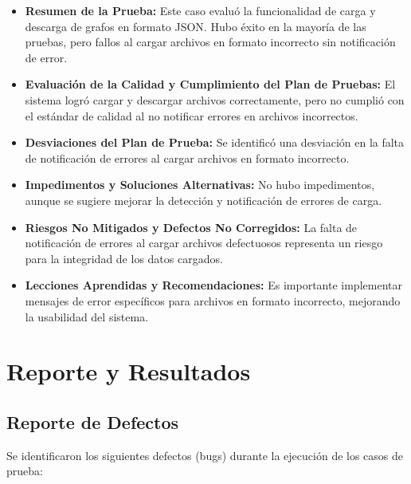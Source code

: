 \documentclass[stu, 12pt, letterpaper, donotrepeattitle, floatsintext, natbib]{apa7}
\begin{document}
\begin{itemize}
    \item \textbf{Resumen de la Prueba:} Este caso evaluó la funcionalidad de carga y descarga de grafos en formato JSON. Hubo éxito en la mayoría de las pruebas, pero fallos al cargar archivos en formato incorrecto sin notificación de error.
    
    \item \textbf{Evaluación de la Calidad y Cumplimiento del Plan de Pruebas:} El sistema logró cargar y descargar archivos correctamente, pero no cumplió con el estándar de calidad al no notificar errores en archivos incorrectos.
    
    \item \textbf{Desviaciones del Plan de Prueba:} Se identificó una desviación en la falta de notificación de errores al cargar archivos en formato incorrecto.
    
    \item \textbf{Impedimentos y Soluciones Alternativas:} No hubo impedimentos, aunque se sugiere mejorar la detección y notificación de errores de carga.
    
    \item \textbf{Riesgos No Mitigados y Defectos No Corregidos:} La falta de notificación de errores al cargar archivos defectuosos representa un riesgo para la integridad de los datos cargados.
    
    \item \textbf{Lecciones Aprendidas y Recomendaciones:} Es importante implementar mensajes de error específicos para archivos en formato incorrecto, mejorando la usabilidad del sistema.
\end{itemize}

\section{Reporte y Resultados}

\subsection{Reporte de Defectos}

\noindent Se identificaron los siguientes defectos (bugs) durante la ejecución de los casos de prueba:
\end{document}
